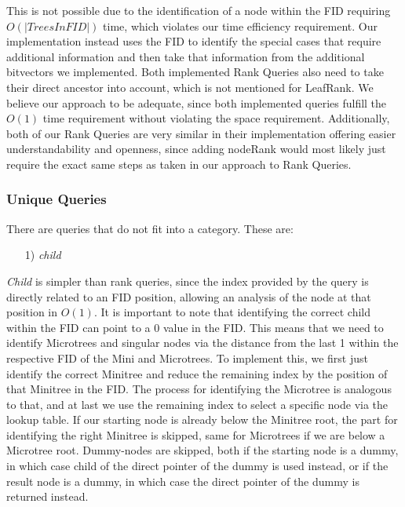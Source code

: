 \documentclass{article}
\begin{document}
This is not possible due to the identification of a node within the FID requiring $O(|Trees In FID|)$ time, which violates our time efficiency requirement. Our implementation instead uses the FID to identify the special cases that require additional information and then take that information from the additional bitvectors we implemented. Both implemented Rank Queries also need to take their direct ancestor into account, which is not mentioned for LeafRank.
We believe our approach to be adequate, since both implemented queries fulfill the $O(1)$ time requirement without violating the space requirement. Additionally, both of our Rank Queries are very similar in their implementation offering easier understandability and openness, since adding nodeRank would most likely just require the exact same steps as taken in our approach to Rank Queries.

\subsubsection{Unique Queries}
There are queries that do not fit into a category. These are:
\begin{itemize}
	\item[1)] \textit{child}
\end{itemize}
\textit{Child} is simpler than rank queries, since the index provided by the query is directly related to an FID position, allowing an analysis of the node at that position in $O(1)$. It is important to note that identifying the correct child within the FID can point to a 0 value in the FID.
This means that we need to identify Microtrees and singular nodes via the distance from the last 1 within the respective FID of the Mini and Microtrees. To implement this, we first just identify the correct Minitree and reduce the remaining index by the position of that Minitree in the FID.
The process for identifying the Microtree is analogous to that, and at last we use the remaining index to select a specific node via the lookup table. If our starting node is already below the Minitree root, the part for identifying the right Minitree is skipped, same for Microtrees if we are below a Microtree root.
Dummy-nodes are skipped, both if the starting node is a dummy, in which case child of the direct pointer of the dummy is used instead, or if the result node is a dummy, in which case the direct pointer of the dummy is returned instead.
\end{document}
